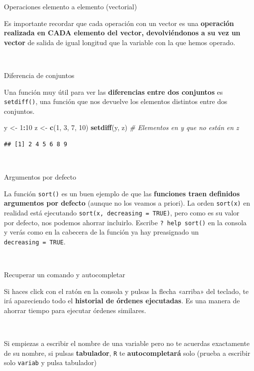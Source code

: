 \documentclass[11pt,]{book}
\newenvironment{Shaded}{\begin{snugshade}}{\end{snugshade}}
\newcommand{\CommentTok}[1]{\textcolor[rgb]{0.37,0.37,0.37}{\textit{#1}}}
\newcommand{\DecValTok}[1]{\textcolor[rgb]{0.06,0.06,0.06}{#1}}
\newcommand{\KeywordTok}[1]{\textcolor[rgb]{0.27,0.27,0.27}{\textbf{#1}}}
\newcommand{\NormalTok}[1]{#1}
\newcommand{\OperatorTok}[1]{\textcolor[rgb]{0.43,0.43,0.43}{\textbf{#1}}}
\newcommand{\StringTok}[1]{\textcolor[rgb]{0.5,0.5,0.5}{#1}}
\begin{document}
Operaciones elemento a elemento (vectorial)

Es importante recordar que cada operación con un vector es una \textbf{operación realizada en CADA elemento del vector, devolviéndonos a su vez un vector} de salida de igual longitud que la variable con la que hemos operado.

~

Diferencia de conjuntos

Una función muy útil para ver las \textbf{diferencias entre dos conjuntos} es \texttt{setdiff()}, una función que nos devuelve los elementos distintos entre dos conjuntos.

\begin{Shaded}
\begin{Highlighting}[]
\NormalTok{y <-}\StringTok{ }\DecValTok{1}\OperatorTok{:}\DecValTok{10}
\NormalTok{z <-}\StringTok{ }\KeywordTok{c}\NormalTok{(}\DecValTok{1}\NormalTok{, }\DecValTok{3}\NormalTok{, }\DecValTok{7}\NormalTok{, }\DecValTok{10}\NormalTok{)}
\KeywordTok{setdiff}\NormalTok{(y, z) }\CommentTok{# Elementos en y que no están en z }
\end{Highlighting}
\end{Shaded}

\begin{verbatim}
## [1] 2 4 5 6 8 9
\end{verbatim}

~

Argumentos por defecto

La función \texttt{sort()} es un buen ejemplo de que las \textbf{funciones traen definidos argumentos por defecto} (aunque no los veamos a priori). La orden \texttt{sort(x)} en realidad está ejecutando \texttt{sort(x,\ decreasing\ =\ TRUE)}, pero como es su valor por defecto, nos podemos ahorrar incluirlo. Escribe \texttt{?\ help\ sort()} en la consola y verás como en la cabecera de la función ya hay preasignado un \texttt{decreasing\ =\ TRUE}.

~

Recuperar un comando y autocompletar

Si haces click con el ratón en la consola y pulsas la flecha «arriba» del teclado, te irá apareciendo todo el \textbf{historial de órdenes ejecutadas}. Es una manera de ahorrar tiempo para ejecutar órdenes similares.

~

Si empiezas a escribir el nombre de una variable pero no te acuerdas exactamente de su nombre, si pulsas \textbf{tabulador}, \texttt{R} te \textbf{autocompletará} solo (prueba a escribir solo \texttt{variab} y pulsa tabulador)
\end{document}
